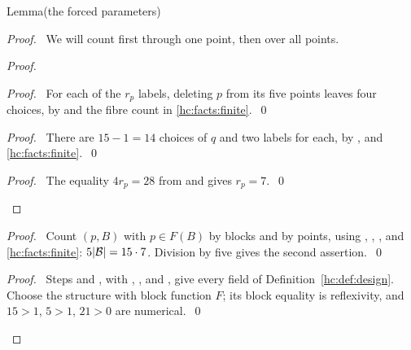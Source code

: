 \begin{mergedproofsection}
\begin{namedresult}{Lemma}{(the forced parameters)}\label{hc:lem:parameters}
 \leavevmode\par
\end{namedresult}
\begin{proof}
 \pfsketch\ We will count first through one point, then over all points.
 \begin{proof}
  \begin{proof}\pf\ For each of the $r_p$ labels, deleting $p$ from
   its five points leaves four choices, by \asm[2]{0} and
   the fibre count in \ref{hc:facts:finite}.~\qed\end{proof}
  \begin{proof}\pf\ There are $15-1=14$ choices of $q$ and two labels
   for each, by \asm[1]{0}, \asm[3]{0} and
   \ref{hc:facts:finite}.~\qed\end{proof}
  \qedstep
  \begin{proof}\pf\ The equality $4r_p=28$ from
    and  gives $r_p=7$.~\qed\end{proof}
 \end{proof}
 \begin{proof}\pf\ Count $(p,B)$ with $p\in F(B)$ by blocks and by
  points, using \asm[1]{0}, \asm[2]{0}, \stepref{hcParPoint}, and
  \ref{hc:facts:finite}: $5|{\mathcal B}|=15\cdot7$. Division by five gives
  the second assertion.~\qed\end{proof}
 \qedstep
 \begin{proof}\pf\ Steps  and ,
  with \asm[1]{0}, \asm[2]{0}, and \asm[3]{0}, give every field of
  Definition~\ref{hc:def:design}. Choose the structure with block
  function $F$; its block equality is reflexivity, and
  $15>1$, $5>1$, $21>0$ are numerical.~\qed\end{proof}
\end{proof}


\end{mergedproofsection}
